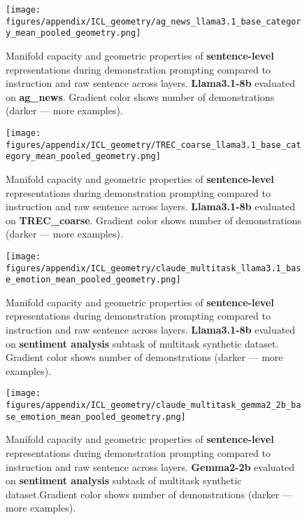 \begin{figure*}
    \centering
    \texttt{[image: figures/appendix/ICL\_geometry/ag\_news\_llama3.1\_base\_category\_mean\_pooled\_geometry.png]}
    \caption{Manifold capacity and geometric properties of \textbf{sentence-level} representations during demonstration prompting compared to instruction and raw sentence across layers. \textbf{Llama3.1-8b} evaluated on \textbf{ag\_news}. Gradient color shows number of demonstrations (darker --- more examples).}
\end{figure*}

\begin{figure*}
    \centering
    \texttt{[image: figures/appendix/ICL\_geometry/TREC\_coarse\_llama3.1\_base\_category\_mean\_pooled\_geometry.png]}
    \caption{Manifold capacity and geometric properties of \textbf{sentence-level} representations during demonstration prompting compared to instruction and raw sentence across layers. \textbf{Llama3.1-8b} evaluated on \textbf{TREC\_coarse}. Gradient color shows number of demonstrations (darker --- more examples).}
\end{figure*}

\begin{figure*}
    \centering
    \texttt{[image: figures/appendix/ICL\_geometry/claude\_multitask\_llama3.1\_base\_emotion\_mean\_pooled\_geometry.png]}
    \caption{Manifold capacity and geometric properties of \textbf{sentence-level} representations during demonstration prompting compared to instruction and raw sentence across layers. \textbf{Llama3.1-8b} evaluated on \textbf{sentiment analysis} subtask of multitask synthetic dataset. Gradient color shows number of demonstrations (darker --- more examples).}
    \label{fig:ICL_sentence_level_extended}
\end{figure*}


\begin{figure*}
    \centering
    \texttt{[image: figures/appendix/ICL\_geometry/claude\_multitask\_gemma2\_2b\_base\_emotion\_mean\_pooled\_geometry.png]}
    \caption{Manifold capacity and geometric properties of \textbf{sentence-level} representations during demonstration prompting compared to instruction and raw sentence across layers. \textbf{Gemma2-2b} evaluated on \textbf{sentiment analysis} subtask of multitask synthetic dataset.Gradient color shows number of demonstrations (darker --- more examples).}
\end{figure*}

